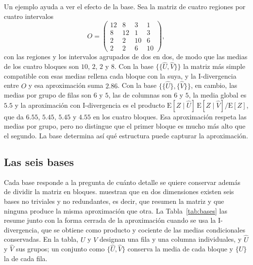Un ejemplo ayuda a ver el efecto de la base. Sea la matriz de cuatro regiones por
cuatro intervalos
\[
  O = \begin{pmatrix}
    12 & 8 & 3 & 1 \\
    8 & 12 & 1 & 3 \\
    2 & 2 & 10 & 6 \\
    2 & 2 & 6 & 10
  \end{pmatrix},
\]
con las regiones y los intervalos agrupados de dos en dos, de modo que las medias
de los cuatro bloques son $10$, $2$, $2$ y $8$. Con la base $\{\{\hat{U}, \hat{V}\}\}$
la matriz más simple compatible con esas medias rellena cada bloque con la suya, y
la I-divergencia entre $O$ y esa aproximación suma $2.86$. Con la base
$\{\{\hat{U}\}, \{\hat{V}\}\}$, en cambio, las medias por grupo de filas son $6$ y $5$,
las de columnas son $6$ y $5$, la media global es $5.5$ y la aproximación con
I-divergencia es el producto $\mathrm{E}[Z \mid \hat{U}]\,\mathrm{E}[Z \mid \hat{V}] /
\mathrm{E}[Z]$, que da $6.55$, $5.45$, $5.45$ y $4.55$ en los cuatro bloques. Esa
aproximación respeta las medias por grupo, pero no distingue que el primer bloque
es mucho más alto que el segundo. La base determina así qué estructura puede
capturar la aproximación.

\subsection{Las seis bases}\label{sec:bases}

Cada base responde a la pregunta de cuánto detalle se quiere conservar además de
dividir la matriz en bloques. \citet[Teorema~3]{Banerjee2007} muestran que en dos
dimensiones existen seis bases no triviales y no redundantes, es decir, que
resumen la matriz y que ninguna produce la misma aproximación que otra. La
Tabla~\ref{tab:bases} las resume junto con la forma cerrada de la aproximación
cuando se usa la I-divergencia, que se obtiene como producto y cociente de las
medias condicionales conservadas. En la tabla, $U$ y $V$ designan una fila y una
columna individuales, y $\hat{U}$ y $\hat{V}$ sus grupos; un conjunto como
$\{\hat{U}, \hat{V}\}$ conserva la media de cada bloque y $\{U\}$ la de cada fila.


